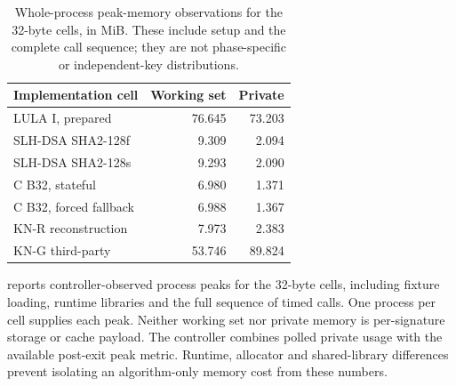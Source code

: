 \begin{table}[t]
\caption{Whole-process peak-memory observations for the 32-byte cells, in MiB. These include setup and the complete call sequence; they are not phase-specific or independent-key distributions.}\label{tab:comparison-memory}
\centering\small
\begin{tabular}{lrr}\toprule
Implementation cell & Working set & Private\\\midrule
LULA I, prepared & 76.645 & 73.203\\
SLH-DSA SHA2-128f & 9.309 & 2.094\\
SLH-DSA SHA2-128s & 9.293 & 2.090\\
C B32, stateful & 6.980 & 1.371\\
C B32, forced fallback & 6.988 & 1.367\\
KN-R reconstruction & 7.973 & 2.383\\
KN-G third-party & 53.746 & 89.824\\
\bottomrule\end{tabular}
\end{table}
 reports controller-observed process peaks for the 32-byte cells, including fixture loading, runtime libraries and the full sequence of timed calls. One process per cell supplies each peak. Neither working set nor private memory is per-signature storage or cache payload. The controller combines polled private usage with the available post-exit peak metric. Runtime, allocator and shared-library differences prevent isolating an algorithm-only memory cost from these numbers.


